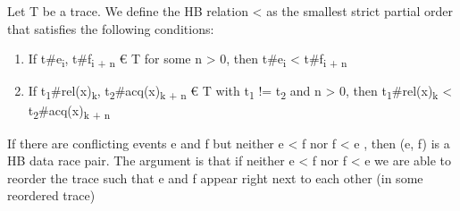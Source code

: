 \documentclass[landscape, a4paper]{article}
\begin{document}
\begin{minipage}[t]{0.19\linewidth}
\begin{betterlist}
		\item Let T be a trace. We define the HB relation < as the smallest strict partial order that satisfies the following conditions:
		\begin{enumerate}
			\item {} If t\#e\textsubscript{i}, t\#f\textsubscript{i + n} € T for some n > 0, then t\#e\textsubscript{i} < t\#f\textsubscript{i + n}
			\item {} If t\textsubscript{1}\#rel(x)\textsubscript{k}, t\textsubscript{2}\#acq(x)\textsubscript{k + n} € T with t\textsubscript{1} != t\textsubscript{2} and n > 0, then t\textsubscript{1}\#rel(x)\textsubscript{k} < t\textsubscript{2}\#acq(x)\textsubscript{k + n}
		\end{enumerate}
		\item {} If there are conflicting events e and f but neither e < f nor f < e , then (e, f) is a HB data race pair. The argument is that if neither e < f nor f < e we are able to reorder the trace such that e and f appear right next to each other (in some reordered trace)

\end{betterlist}
\end{minipage}
\end{document}
